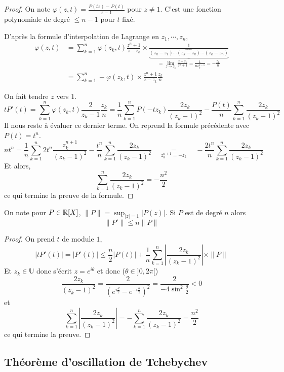 \begin{proof}
On note $\varphi(z, t)=\frac{P(tz)-P(t)}{z-1}$ pour $z\neq 1$. C'est une fonction polynomiale de degré $\leq n-1$ pour $t$ fixé.

D'après la formule d'interpolation de Lagrange en $z_1, \cdots, z_n$, \begin{align*}
    \varphi(z, t)&=\sum_{k=1}^n\varphi(z_k, t)\frac{z^n+1}{z-z_k} \times \underbrace{\frac1{(z_k-z_1)\cdots \widehat{(z_k-z_k)}\cdots (z_k-z_n)}}_{=\lim_{z\to z_k}\limits \frac{z-z_k}{z^n+1}=\frac1{nz_k^{n-1}}=-\frac{z_k}n} \\ &= \sum_{k=1}^n-\varphi(z_k, t)\times \frac{z^n+1}{z-z_k}\frac{z_k}n
\end{align*}

On fait tendre $z$ vers $1$. \[
    tP'(t)=\sum_{k=1}^n\varphi(z_k, t)\frac{2}{z_k-1}\frac{z_k}n=
    \frac1n\sum_{k=1}^nP(-tz_k)\frac{2z_k}{(z_k-1)^2}-\frac{P(t)}{n}\sum_{k=1}^n\frac{2z_k}{(z_k-1)^2}
\]
Il nous reste à évaluer ce dernier terme. On reprend la formule précédente avec $P(t)=t^n$. \[
    nt^n=\frac1n\sum_{k=1}^n2t^n\frac{z_k^{n+1}}{(z_k-1)^2}-\frac{t^n}{n}\sum_{k=1}^n\frac{2z_k}{(z_k-1)^2}\quad \underset{z_k^{n+1}=-z_k}{=}\quad -\frac{2t^n}n\sum_{k=1}^n\frac{2z_k}{(z_k-1)^2}
\]
Et alors,
\[
\sum_{k=1}^n\frac{2z_k}{(z_k-1)^2}=-\frac{n^2}2
\]
ce qui termine la preuve de la formule.
\end{proof}

\begin{res}
On note pour $P\in\mathbb R[X]$, $\|P\|=\sup_{|z|=1}\limits|P(z)|$. Si $P$ est de degré $n$ alors \[
    \|P'\|\leq n\|P\|
\]
\end{res}

\begin{proof}
On prend $t$ de module $1$, \[
    |tP'(t)|=|P'(t)|\leq \frac n2|P(t)|+\frac1n\sum_{k=1}^n\left|\frac{2z_k}{(z_k-1)^2}\right|\times \|P\|
\]
Et $z_k\in\mathbb U$ donc s'écrit $z=e^{i\theta}$ et donc ($\theta\in ]0, 2\pi[$) \[
    \frac{2z_k}{(z_k-1)^2}=\frac{2}{(e^{i\frac \theta 2}-e^{-i\frac \theta2})^2}=\frac 2{-4\sin^2\frac\theta 2}<0
\]
et \[
    \sum_{k=1}^n\left|\frac{2z_k}{(z_k-1)^2}\right|=-\sum_{k=1}^n\frac{2z_k}{(z_k-1)^2}=\frac{n^2}2
\]
ce qui termine la preuve.
\end{proof}

\subsection{Théorème d'oscillation de Tchebychev}

